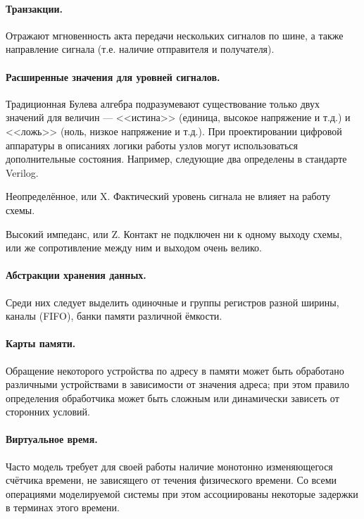 \paragraph{Транзакции.} Отражают мгновенность акта передачи нескольких сигналов по шине, а также направление сигнала (т.е. наличие отправителя и получателя).

\paragraph{Расширенные значения для уровней сигналов.} Традиционная Булева алгебра подразумевают существование только двух значений для величин — <<истина>> (единица, высокое напряжение и т.д.) и <<ложь>> (ноль, низкое напряжение и т.д.). При проектировании цифровой аппаратуры в описаниях логики работы узлов могут использоваться дополнительные состояния. Например, следующие два определены в стандарте Verilog.
\begin{enumerate*}
\item Неопределённое, или X. Фактический уровень сигнала не влияет на работу схемы.
\item Высокий импеданс, или Z. Контакт не подключен ни к одному выходу схемы, или же сопротивление между ним и выходом очень велико.
\end{enumerate*}

\paragraph{Абстракции хранения данных.} Среди них следует выделить одиночные и группы регистров разной ширины, каналы (FIFO), банки памяти различной ёмкости.

\paragraph{Карты памяти.} Обращение некоторого устройства по адресу в памяти может быть обработано различными устройствами в зависимости от значения адреса; при этом правило определения обработчика может быть сложным или динамически зависеть от сторонних условий.


\paragraph{Виртуальное время.} Часто модель требует для своей работы наличие монотонно изменяющегося счётчика времени, не зависящего от течения физического времени. Со всеми операциями моделируемой системы при этом ассоциированы некоторые задержки в терминах этого времени.

